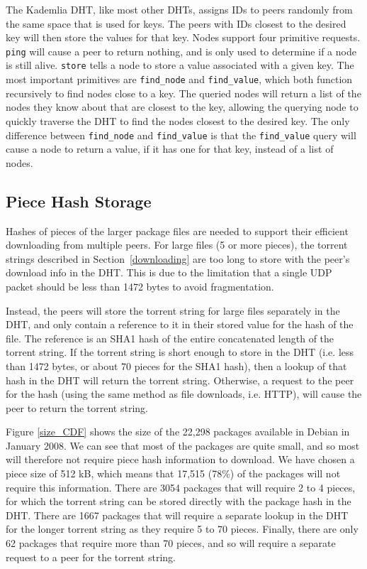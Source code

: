 \documentclass[conference]{IEEEtran}
\begin{document}
The Kademlia DHT, like most other DHTs, assigns IDs to peers randomly from
the same space that is used for keys. The peers with IDs closest to
the desired key will then store the values for that key.
Nodes support four primitive requests.
\texttt{ping} will cause a peer to return nothing, and is only used
to determine if a node is still alive. \texttt{store} tells a
node to store a value associated with a given key. The most
important primitives are \texttt{find\_node} and
\texttt{find\_value}, which both function recursively to find nodes
close to a key. The queried nodes will return a list of the nodes
they know about that are closest to the key, allowing the querying
node to quickly traverse the DHT to find the nodes closest to the
desired key. The only difference between \texttt{find\_node} and \texttt{find\_value} is that the
\texttt{find\_value} query will cause a node to return a value, if
it has one for that key, instead of a list of nodes.

\subsection{Piece Hash Storage}
\label{pieces}

Hashes of pieces of the larger package files are needed to support
their efficient downloading from multiple peers.
For large files (5 or more pieces), the torrent strings described in
Section~\ref{downloading}
are too long to store with the peer's download info in the DHT. This
is due to the limitation that a single UDP packet should be less
than 1472 bytes to avoid fragmentation.

Instead, the peers will store the torrent string for large files
separately in the DHT, and only contain a reference to it in their
stored value for the hash of the file. The reference is an SHA1 hash
of the entire concatenated length of the torrent string. If the
torrent string is short enough to store in the DHT (i.e. less than
1472 bytes, or about 70 pieces for the SHA1 hash), then a lookup of
that hash in the DHT will return the torrent string. Otherwise, a
request to the peer for the hash (using the same method as file
downloads, i.e. HTTP), will cause the peer to return the torrent
string.

Figure \ref{size_CDF} shows the size of the 22,298 packages
available in Debian in January 2008. We can see that most of the
packages are quite small, and so most will therefore not require
piece hash information to download. We have chosen a piece
size of 512 kB, which means that 17,515 (78\%) of the packages will
not require this information. There are 3054 packages that will
require 2 to 4 pieces, for which the torrent string can be stored
directly with the package hash in the DHT. There are 1667 packages
that will require a separate lookup in the DHT for the longer
torrent string as they require 5 to 70 pieces. Finally, there are
only 62 packages that require more than 70 pieces, and so will
require a separate request to a peer for the torrent string.
\end{document}
